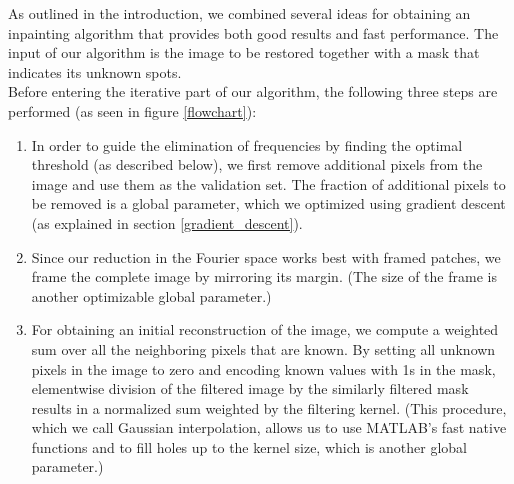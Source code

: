 \documentclass[10pt,conference,compsocconf]{IEEEtran}
\begin{document}
As outlined in the introduction, we combined several ideas for obtaining an inpainting algorithm that provides both good results and fast performance. The input of our algorithm is the image to be restored together with a mask that indicates its unknown spots.\\
Before entering the iterative part of our algorithm, the following three steps are performed (as seen in figure \ref{flowchart}):
\begin{enumerate}
\item In order to guide the elimination of frequencies by finding the optimal threshold (as described below), we first remove additional pixels from the image and use them as the validation set. The fraction of additional pixels to be removed is a global parameter, which we optimized using gradient descent (as explained in section \ref{gradient_descent}).
\item Since our reduction in the Fourier space works best with framed patches, we frame the complete image by mirroring its margin. (The size of the frame is another optimizable global parameter.)
\item For obtaining an initial reconstruction of the image, we compute a weighted sum over all the neighboring pixels that are known. By setting all unknown pixels in the image to zero and encoding known values with 1s in the mask, elementwise division of the filtered image by the similarly filtered mask results in a normalized sum weighted by the filtering kernel. (This procedure, which we call Gaussian interpolation, allows us to use MATLAB's fast native functions and to fill holes up to the kernel size, which is another global parameter.)
\end{enumerate}
\end{document}
